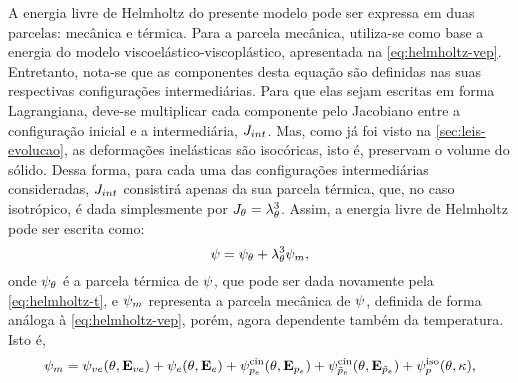 \documentclass[Tese.tex]{subfiles}
\begin{document}
A energia livre de Helmholtz do presente modelo pode ser expressa em duas parcelas: mecânica e térmica. Para a parcela mecânica, utiliza-se como base a energia do modelo viscoelástico-viscoplástico, apresentada na \cref{eq:helmholtz-vep}. Entretanto, nota-se que as componentes desta equação são definidas nas suas respectivas configurações intermediárias. Para que elas sejam escritas em forma Lagrangiana, deve-se multiplicar cada componente pelo Jacobiano entre a configuração inicial e a intermediária, $J_{int}$. Mas, como já foi visto na \autoref{sec:leis-evolucao}, as deformações inelásticas são isocóricas, isto é, preservam o volume do sólido. Dessa forma, para cada uma das configurações intermediárias consideradas, $J_{int}$ consistirá apenas da sua parcela térmica, que, no caso isotrópico, é dada simplesmente por $J_{\theta} = \lambda_{\theta}^3$. Assim, a energia livre de Helmholtz pode ser escrita como:
\begin{equation}\label{eq:helmholtz-tvep}
\psi = \psi_{\theta} + \lambda_{\theta}^3\psi_m,
\end{equation}
onde $\psi_{\theta}$ é a parcela térmica de $\psi$, que pode ser dada novamente pela \cref{eq:helmholtz-t}, e $\psi_m$ representa a parcela mecânica de $\psi$, definida de forma análoga à \cref{eq:helmholtz-vep}, porém, agora dependente também da temperatura. Isto é,
\begin{equation}\label{eq:helmholtz-m}
\psi_m = \psi_{ve}(\theta,\mathbf{E}_{ve}) + \psi_e(\theta,\mathbf{E}_e) + \psi_{p_e}^\text{cin}(\theta,\mathbf{E}_{p_e}) + \psi_{\tilde{p}_e}^\text{cin}(\theta,\mathbf{E}_{\tilde{p}_e}) + \psi_p^\text{iso}(\theta,\kappa),
\end{equation}
\end{document}
